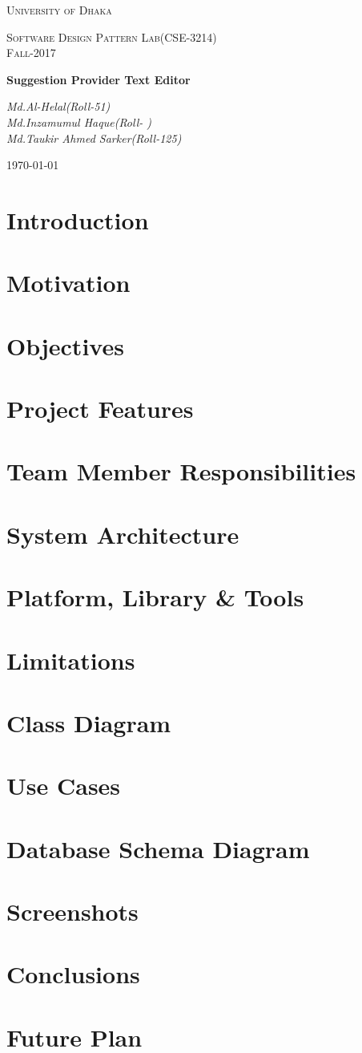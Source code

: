 \documentclass[a4paper]{article}
\begin{document}
\begin{titlepage}
\centering
{\scshape\LARGE University of Dhaka \par}
\vspace{1cm}
\vfill
{\scshape\Large Software Design Pattern Lab(CSE-3214)\\Fall-2017\par}
\vspace{1.5cm}
\vfill
{\huge\bfseries Suggestion Provider Text Editor\par}
\vspace{2cm}
\vfill
{\Large\itshape Md.Al-Helal(Roll-51)\\Md.Inzamumul Haque(Roll-  )\\Md.Taukir Ahmed Sarker(Roll-125)\par}
\vfill
{\large \today\par}
\end{titlepage}

\section{Introduction}
\section{Motivation}
\section{Objectives}
\section{Project Features}
\section{Team Member Responsibilities}
\section{System Architecture}
\section{Platform, Library \& Tools}
\section{Limitations}
\section{Class Diagram}
\section{Use Cases}
\section{Database Schema Diagram}
\section{Screenshots}
\section{Conclusions}
\section{Future Plan}
\end{document}
